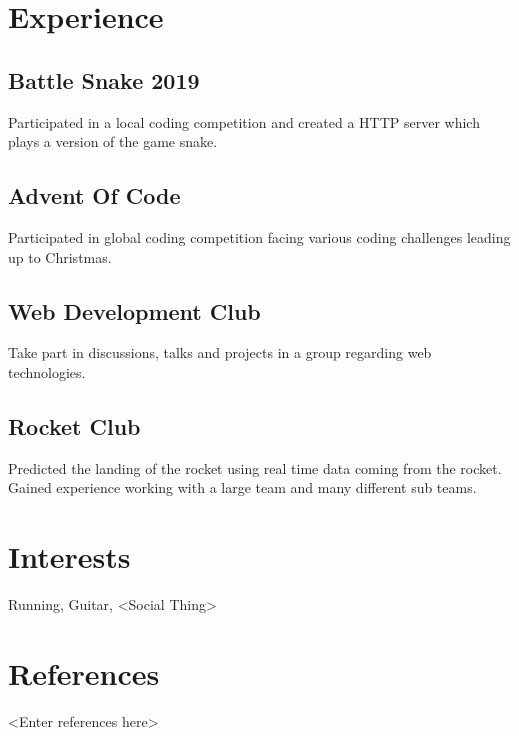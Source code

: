 \documentclass{article}
\newcommand{\hrefColored}[3]{\href{#2}{\color{#1}{#3}}}
\begin{document}
\section{Experience}

\subsection{Battle Snake 2019 \hrefColored{blue}{https://github.com/McRaeAlex/BattleSnake2019}{github.com/McRaeAlex/BattleSnake2019}}

Participated in a local coding competition and created a HTTP server which plays
a version of the game snake.

\subsection{Advent Of Code \hrefColored{blue}{https://github.com/McRaeAlex/AdventOfCode2018}{github.com/McRaeAlex/AdventOfCode2018}}

Participated in global coding competition facing various coding challenges
leading up to Christmas.

\subsection{Web Development Club}

Take part in discussions, talks and projects in a group regarding web 
technologies.

\subsection{Rocket Club}

Predicted the landing of the rocket using real time data coming from the rocket. 
Gained experience working with a large team and many different sub teams.

\section{Interests}

Running, Guitar, <Social Thing>

\section{References}

<Enter references here>
\end{document}
